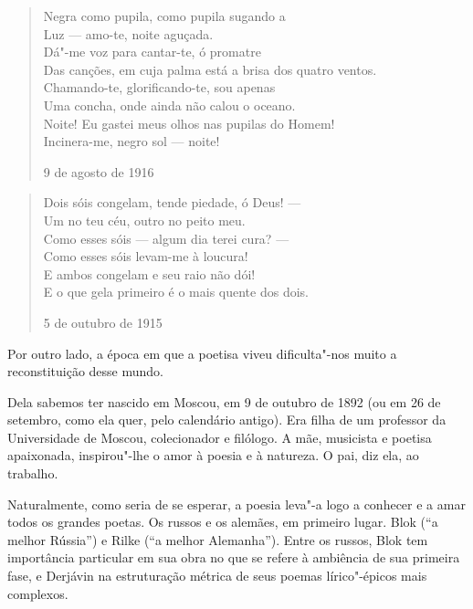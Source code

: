 \begin{verse}
Negra como pupila, como pupila sugando a \\
Luz --- amo-te, noite aguçada. \\[8pt]
Dá"-me voz para cantar-te, ó promatre \\
Das canções, em cuja palma está a brisa \qb{}dos quatro ventos. \\[8pt]
Chamando-te, glorificando-te, sou apenas \\
Uma concha, onde ainda não calou o oceano. \\[8pt]
Noite! Eu gastei meus olhos nas pupilas \qb{}do Homem! \\
Incinera-me, negro sol --- noite!

9 de agosto de 1916
\end{verse}

\bigskip

\begin{verse}
Dois sóis congelam, tende piedade, \qb{}ó Deus! --- \\
Um no teu céu, outro no peito meu. \\[8pt]
Como esses sóis --- algum dia terei cura? --- \\
Como esses sóis levam-me à loucura! \\[8pt]
E ambos congelam e seu raio não dói! \\
E o que gela primeiro é o mais quente dos dois.

5 de outubro de 1915

\end{verse}

Por outro lado, a época em que a poetisa viveu dificulta"-nos muito a reconstituição desse mundo.

Dela sabemos ter nascido em Moscou, em 9 de outubro de 1892 (ou
em 26 de setembro, como ela quer, pelo calendário antigo). Era
filha de um professor da Universidade de Moscou, colecionador e
filólogo. A mãe, musicista e poetisa apaixonada, inspirou"-lhe o
amor à poesia e à natureza. O pai, diz ela, ao trabalho.

Naturalmente, como seria de se esperar, a poesia leva"-a logo a
conhecer e a amar todos os grandes poetas. Os russos e os alemães,
em primeiro lugar. Blok (``a melhor Rússia'') e Rilke (``a melhor
Alemanha''). Entre os russos, Blok tem importância particular em
sua obra no que se refere à ambiência de sua primeira fase, e
Derjávin na estruturação métrica de seus poemas lírico"-épicos
mais complexos.

